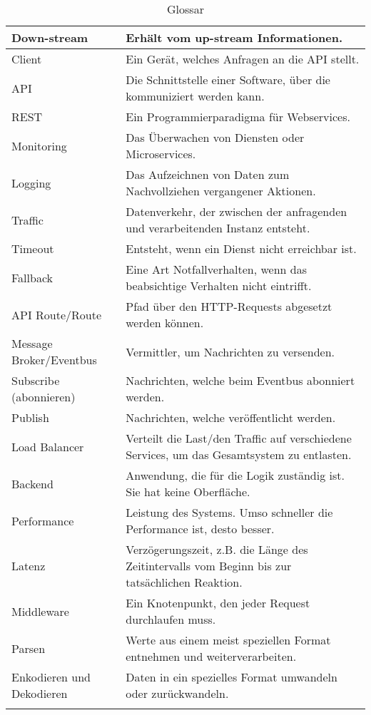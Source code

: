 \begin{longtable}{|l|p{10cm}|}
	Down-stream & Erhält vom up-stream Informationen.\\ \hline
	Client & Ein Gerät, welches Anfragen an die API stellt. \\ \hline
	API & Die Schnittstelle einer Software, über die kommuniziert werden kann.\\ \hline
	REST & Ein Programmierparadigma für Webservices. \\ \hline
	Monitoring & Das Überwachen von Diensten oder Microservices.\\ \hline
	Logging & Das Aufzeichnen von Daten zum Nachvollziehen vergangener Aktionen.\\ \hline
	Traffic & Datenverkehr, der zwischen der anfragenden und verarbeitenden Instanz entsteht.\\ \hline
	Timeout & Entsteht, wenn ein Dienst nicht erreichbar ist.\\ \hline
	Fallback & Eine Art Notfallverhalten, wenn das beabsichtige Verhalten nicht eintrifft.\\ \hline
	API Route/Route & Pfad über den HTTP-Requests abgesetzt werden können.\\ \hline
	Message Broker/Eventbus & Vermittler, um Nachrichten zu versenden.  \\ \hline
	Subscribe (abonnieren) & Nachrichten, welche beim Eventbus abonniert werden. \\ \hline
	Publish & Nachrichten, welche veröffentlicht werden. \\ \hline
	Load Balancer & Verteilt die Last/den Traffic auf verschiedene Services, um das Gesamtsystem zu entlasten.\\ \hline
	Backend & Anwendung, die für die Logik zuständig ist. Sie hat keine Oberfläche.\\ \hline
	Performance & Leistung des Systems. Umso schneller die Performance ist, desto besser.\\ \hline
	Latenz & Verzögerungszeit, z.B. die Länge des Zeitintervalls vom Beginn bis zur tatsächlichen Reaktion.\\ \hline
	Middleware & Ein Knotenpunkt, den jeder Request durchlaufen muss. \\ \hline
	Parsen & Werte aus einem meist speziellen Format entnehmen und weiterverarbeiten. \\ \hline 
	Enkodieren und Dekodieren & Daten in ein spezielles Format umwandeln oder zurückwandeln.\\ \hline
	\caption[Glossar]{Glossar}
\end{longtable}
\pagebreak